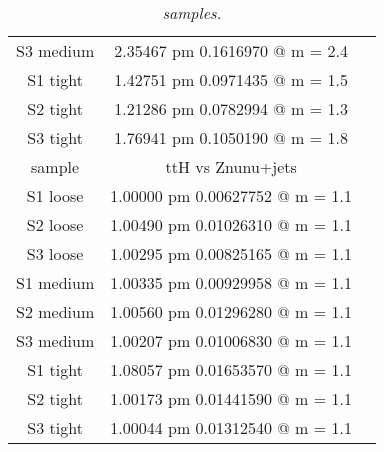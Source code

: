 \documentclass[12pt,a4paper,twoside,english]{report}
\begin{document}
\begin{table}[h!]
\begin{tabular}{||c|c|c||}
    S3 medium & 2.35467 pm 0.1616970 @ m = 2.4\\
    S1 tight  & 1.42751 pm 0.0971435 @ m = 1.5\\
    S2 tight  & 1.21286 pm 0.0782994 @ m = 1.3\\
    S3 tight  & 1.76941 pm 0.1050190 @ m = 1.8\\
    \hline
    \hline
    sample & ttH vs Znunu+jets\\
    \hline
    S1 loose  & 1.00000 pm 0.00627752 @ m = 1.1\\
    S2 loose  & 1.00490 pm 0.01026310 @ m = 1.1\\ 
    S3 loose  & 1.00295 pm 0.00825165 @ m = 1.1\\
    S1 medium & 1.00335 pm 0.00929958 @ m = 1.1\\
    S2 medium & 1.00560 pm 0.01296280 @ m = 1.1\\
    S3 medium & 1.00207 pm 0.01006830 @ m = 1.1\\
    S1 tight  & 1.08057 pm 0.01653570 @ m = 1.1\\
    S2 tight  & 1.00173 pm 0.01441590 @ m = 1.1\\
    S3 tight  & 1.00044 pm 0.01312540 @ m = 1.1\\
    \hline
    \hline
  \end{tabular}
  \center\caption{\footnotesize{\em samples.}}
  \label{t:ttjets_sample}
\end{table}
\end{document}
